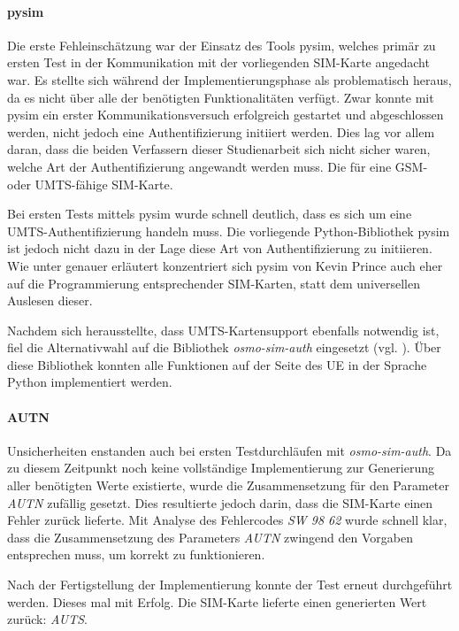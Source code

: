 		\paragraph{pysim}
		Die erste Fehleinschätzung war der Einsatz des Tools pysim, welches
		primär zu ersten Test in der Kommunikation mit der vorliegenden
		SIM-Karte angedacht war. Es stellte sich während der Implementierungsphase
		als problematisch heraus, da es nicht über alle der benötigten 
		Funktionalitäten verfügt. Zwar konnte mit pysim ein erster
		Kommunikationsversuch erfolgreich gestartet und abgeschlossen werden,
		nicht jedoch eine Authentifizierung initiiert werden. Dies lag
		vor allem daran, dass die beiden Verfassern dieser Studienarbeit sich nicht
		sicher waren, welche Art der Authentifizierung angewandt werden muss.
		Die für eine GSM- oder UMTS-fähige SIM-Karte.

		Bei ersten Tests mittels pysim wurde schnell deutlich, dass es
		sich um eine UMTS-Authentifizierung handeln muss. Die vorliegende
		Python-Bibliothek pysim ist jedoch nicht dazu in der Lage diese
		Art von Authentifizierung zu initiieren. Wie unter 
		genauer erläutert konzentriert sich pysim von Kevin Prince auch
		eher auf die Programmierung entsprechender SIM-Karten, statt
		dem universellen Auslesen dieser.

		Nachdem sich herausstellte, dass \ac{UMTS}-Kartensupport ebenfalls 
		notwendig ist, fiel die Alternativwahl
		auf die Bibliothek \textit{osmo-sim-auth} eingesetzt
		(vgl. ). Über diese Bibliothek konnten
		alle Funktionen auf der Seite des UE in der Sprache Python
		implementiert werden.

		\paragraph{AUTN} Unsicherheiten enstanden auch bei ersten Testdurchläufen
		mit \textit{osmo-sim-auth}. Da zu diesem Zeitpunkt noch keine 
		vollständige Implementierung zur Generierung aller benötigten
		Werte existierte, wurde die Zusammensetzung für den
		Parameter \textit{AUTN} zufällig gesetzt. Dies resultierte jedoch
		darin, dass die SIM-Karte einen Fehler zurück lieferte. Mit
		Analyse des Fehlercodes \textit{SW 98 62} wurde schnell klar,
		dass die Zusammensetzung des Parameters \textit{AUTN} zwingend
		den Vorgaben entsprechen muss, um korrekt zu funktionieren.

		Nach der Fertigstellung der Implementierung konnte der Test erneut
		durchgeführt werden. Dieses mal mit Erfolg. Die SIM-Karte lieferte
		einen generierten Wert zurück: \textit{AUTS}.

